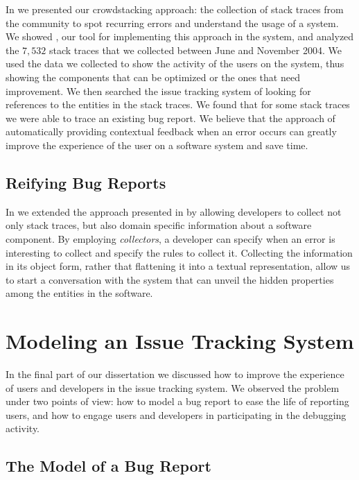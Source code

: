 In  we presented our crowdstacking approach: the collection of stack traces from the community to spot recurring errors and understand the usage of a system.
We showed \slr, our tool for implementing this approach in the \pha system, and analyzed the $7,532$ stack traces that we collected between June and November 2004.
We used the data we collected to show the activity of the users on the system, thus showing the components that can be optimized or the ones that need improvement.
We then searched the issue tracking system of \pha looking for references to the entities in the stack traces.
We found that for some stack traces we were able to trace an existing bug report.
We believe that the approach of automatically providing contextual feedback when an error occurs can greatly improve the experience of the user on a software system and save time.


\subsection{Reifying Bug Reports}

In  we extended the approach presented in  by allowing developers to collect not only stack traces, but also domain specific information about a software component.
By employing \emph{collectors}, a developer can specify when an error is interesting to collect and specify the rules to collect it.
Collecting the information in its object form, rather that flattening it into a textual representation, allow us to start a conversation with the system that can unveil the hidden properties among the entities in the software.



\section{Modeling an Issue Tracking System}

In the final part of our dissertation we discussed how to improve the experience of users and developers in the issue tracking system.
We observed the problem under two points of view: how to model a bug report to ease the life of reporting users, and how to engage users and developers in participating in the debugging activity.


\subsection{The Model of a Bug Report}

